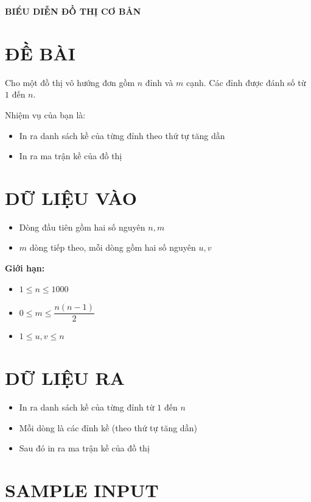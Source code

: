 \documentclass[a4paper,12pt]{article}
\begin{document}
\begin{center}
    \textbf{\Large BIỂU DIỄN ĐỒ THỊ CƠ BẢN}
\end{center}

\section*{ĐỀ BÀI}

Cho một đồ thị vô hướng đơn gồm $n$ đỉnh và $m$ cạnh.  
Các đỉnh được đánh số từ $1$ đến $n$.

Nhiệm vụ của bạn là:
\begin{itemize}
    \item In ra danh sách kề của từng đỉnh theo thứ tự tăng dần
    \item In ra ma trận kề của đồ thị
\end{itemize}

\section*{DỮ LIỆU VÀO}

\begin{itemize}
    \item Dòng đầu tiên gồm hai số nguyên $n, m$
    \item $m$ dòng tiếp theo, mỗi dòng gồm hai số nguyên $u, v$
\end{itemize}

\textbf{Giới hạn:}
\begin{itemize}
    \item $1 \le n \le 1000$
    \item $0 \le m \le \dfrac{n(n-1)}{2}$
    \item $1 \le u, v \le n$
\end{itemize}

\section*{DỮ LIỆU RA}

\begin{itemize}
    \item In ra danh sách kề của từng đỉnh từ $1$ đến $n$
    \item Mỗi dòng là các đỉnh kề (theo thứ tự tăng dần)
    \item Sau đó in ra ma trận kề của đồ thị
\end{itemize}

\section*{SAMPLE INPUT}
\end{document}
